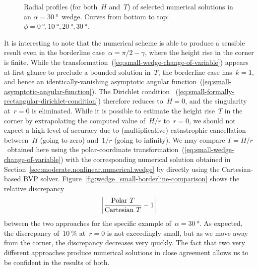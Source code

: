 \begin{figure}
  \newcommand*{\subfigurewidth}{0.45\textwidth}
  \centering
  \begin{subfigure}[t]{\subfigurewidth}
  \end{subfigure}
    \hfill
  \begin{subfigure}[t]{\subfigurewidth}
  \end{subfigure}
  \caption{
    Radial profiles (for both~$H$ and~$T$) of selected numerical solutions
    in an $\alpha = \SI{30}{\degree}$~wedge.
    Curves from bottom to top:
    $\phi =
      \SI{0}{\degree}, \SI{10}{\degree},
      \SI{20}{\degree}, \SI{30}{\degree}$.
  }
  \label{fig:wedge_small-solution}
\end{figure}

It is interesting to note that
the numerical scheme is able to produce a sensible result
even in the borderline case~$\alpha = \pi/2 - \gamma$,
where the height rise in the corner is finite.
While the transformation~(\ref{eq:small-wedge-change-of-variable})
appears at first glance to preclude a bounded solution in~$T$,
the borderline case has~$k = 1$,
and hence an identically-vanishing
asymptotic angular function~(\ref{eq:small-asymptotic-angular-function}).
The Dirichlet condition~%
  (\ref{eq:small-formally-rectangular-dirichlet-condition})
therefore reduces to~$H = 0$,
and the singularity at~$r = 0$ is eliminated.
While it is possible to estimate the height rise~$T$ in the corner
by extrapolating the computed value of~$H / r$ to~$r = 0$,
we should not expect a high level of accuracy
due to (multiplicative) catastrophic cancellation
between~$H$ (going to zero) and~$1 / r$ (going to infinity).
We may compare $T = H / r$~obtained here using
the polar-coordinate transformation~(\ref{eq:small-wedge-change-of-variable})
with the corresponding numerical solution
obtained in Section~\ref{sec:moderate.nonlinear.numerical.wedge}
by directly using the Cartesian-based BVP solver.
Figure~\ref{fig:wedge_small-borderline-comparison}
shows the relative discrepancy
\begin{equation}
  \abs*{\frac{\textq{Polar~$T$}}{\textq{Cartesian~$T$}} - 1}
  \label{eq:wedge_small-relative-discrepancy-with-cartesian}
\end{equation}
between the two approaches
for the specific example of~$\alpha = \SI{30}{\degree}$.
As expected,
the discrepancy of~$\SI{10}{\percent}$ at~$r = 0$
is not exceedingly small,
but as we move away from the corner,
the discrepancy decreases very quickly.
The fact that two very different approaches
produce numerical solutions in close agreement
allows us to be confident in the results of both.

